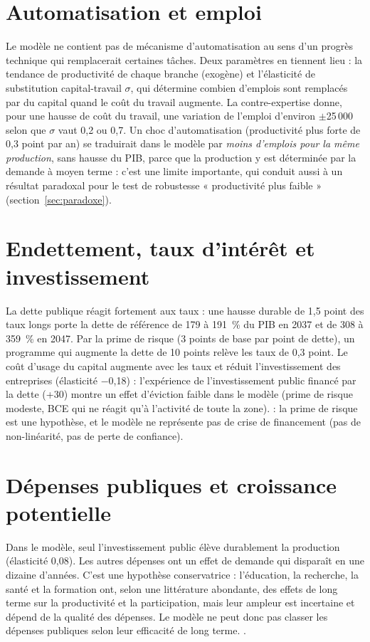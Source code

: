 \section{Automatisation et emploi}

Le modèle ne contient pas de mécanisme d'automatisation au sens d'un progrès technique qui remplacerait certaines tâches.
Deux paramètres en tiennent lieu : la tendance de productivité de chaque branche (exogène) et l'élasticité de
substitution capital-travail $\sigma$, qui détermine combien d'emplois sont remplacés par du capital quand le coût du
travail augmente. La contre-expertise donne, pour une hausse de coût du travail, une variation de l'emploi d'environ
$\pm$25\,000 selon que $\sigma$ vaut 0,2 ou 0,7. Un choc d'automatisation (productivité plus forte de 0,3 point par
an) se traduirait dans le modèle par \emph{moins d'emplois pour la même production}, sans hausse du PIB, parce que la
production y est déterminée par la demande à moyen terme : c'est une limite importante, qui conduit aussi à un résultat
paradoxal pour le test de robustesse « productivité plus faible » (section~\ref{sec:paradoxe}).

\section{Endettement, taux d'intérêt et investissement}

La dette publique réagit fortement aux taux : une hausse durable de 1,5 point des taux longs porte la dette de
référence de 179 à 191~\% du PIB en 2037 et de 308 à 359~\% en 2047. Par la prime de risque (3 points de base par point
de dette), un programme qui augmente la dette de 10 points relève les taux de 0,3 point. Le coût d'usage du capital
augmente avec les taux et réduit l'investissement des entreprises (élasticité $-$0,18) : l'expérience de l'investissement
public financé par la dette (+30\md) montre un effet d'éviction faible dans le modèle (prime de risque modeste, BCE qui
ne réagit qu'à l'activité de toute la zone).  : la prime de risque est une hypothèse, et le modèle ne
représente pas de crise de financement (pas de non-linéarité, pas de perte de confiance).

\section{Dépenses publiques et croissance potentielle}

Dans le modèle, seul l'investissement public élève durablement la production (élasticité 0,08). Les autres dépenses ont
un effet de demande qui disparaît en une dizaine d'années. C'est une hypothèse conservatrice : l'éducation, la
recherche, la santé et la formation ont, selon une littérature abondante, des effets de long terme sur la productivité
et la participation, mais leur ampleur est incertaine et dépend de la qualité des dépenses. Le modèle ne peut donc pas
classer les dépenses publiques selon leur efficacité de long terme. .

